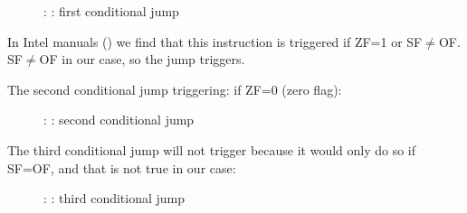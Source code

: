 \begin{figure}[H]
\centering
{}
\caption{\olly: : first conditional jump}
\label{fig:jcc_olly_signed_1}
\end{figure}

In Intel manuals () we find that this instruction is triggered if ZF=1 or SF$\neq$OF.
SF$\neq$OF in our case, so the jump triggers.

\clearpage
The second \JNZ conditional jump triggering: if ZF=0 (zero flag):

\begin{figure}[H]
\centering
{}
\caption{\olly: : second conditional jump}
\label{fig:jcc_olly_signed_2}
\end{figure}

\clearpage
The third conditional jump \JGE will not trigger because it would only do so if SF=OF, and that is not true in our case:

\begin{figure}[H]
\centering
{}
\caption{\olly: : third conditional jump}
\label{fig:jcc_olly_signed_3}
\end{figure}
